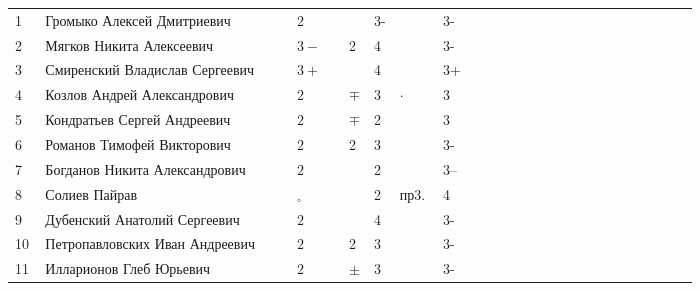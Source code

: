 \documentclass[a4paper,11pt]{article}
\newcommand*\OK{&\small \ding{51}$\!\!_\circ$} %
\newcommand*\ok{&{\small \ding{51}}} %
\newcommand*\no{&{\small }} %
\newcommand\PM{&$\pm$}
\newcommand\MP{&$\mp$}
\begin{document}
\begin{tabular}{p{7pt}|l|p{6pt}p{6pt}p{6pt}p{6pt}p{6pt}p{6pt}p{16pt}p{6pt}p{6pt}p{6pt}p{6pt}p{6pt}p{6pt}p{6pt}p{6pt}p{6pt}p{6pt}p{6pt}p{6pt}p{6pt}p{6pt}p{6pt}p{6pt}p{6pt}}
\\
\midrule
		1\,&Громыко Алексей Дмитриевич	     \ok\ok&2   \ok\no&3-\no     &3- \ok\ok\ok\\
		2\,&Мягков Никита Алексеевич         \ok\ok&$3-$\ok&2  &4\no     &3- \ok\no\ok\\		
		3\,&Смиренский Владислав Сергеевич   \ok\ok&$3+$\ok\no &4\no     &3+ \ok\ok\ok\\
		4\,&Козлов Андрей Александрович      \ok\ok&$2$ \ok\MP &3&$\cdot$&3  \ok\ok\no\\
		5\,&Кондратьев Сергей Андреевич      \ok\ok&$2$ \ok\MP &2\no     &3  \ok\ok\ok\\
		6\,&Романов Тимофей Викторович       \ok\ok&$2$ \ok&2  &3\no     &3- \ok\ok\ok\\
		7\,&Богданов Никита Александрович    \ok\no&$2$ \ok\no &2\no     &3--\ok\ok\ok\\
		8\,&Солиев Пайрав                    \ok\ok\OK  \no\ok &2&пр3.$\;$&4 \ok\ok\ok\\
		9\,&Дубенский Анатолий Сергеевич     \ok\ok&$2$ \ok\no &4\no     &3- \ok\ok\ok\\
\midrule
		10\,&Петропавловских Иван Андреевич  \ok\ok&$2$ \ok&2  &3\no     &3- \ok\ok\ok\\
		11\,&Илларионов Глеб Юрьевич         \ok\ok&$2$ \ok\PM &3\no     &3- \ok\ok\ok\\
\bottomrule
\end{tabular} 
\end{document}

